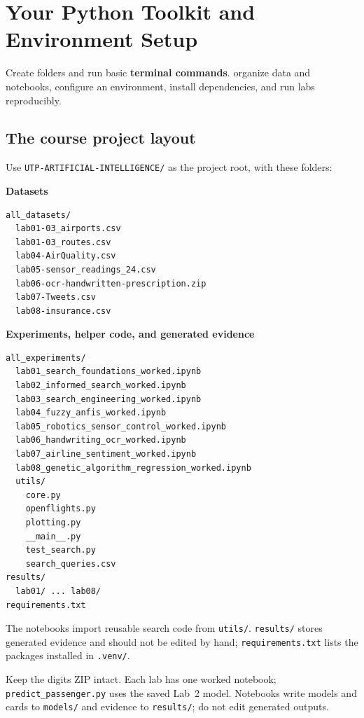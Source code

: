 \chapter{Your Python Toolkit and Environment Setup}
\label{ch:python}

\chapterguide%
  {Create folders and run basic \textbf{terminal commands}.}
  {organize data and notebooks, configure an environment, install dependencies, and run labs reproducibly.}

\section{The course project layout}

Use \texttt{UTP-ARTIFICIAL-INTELLIGENCE/} as the project root, with these folders:

\noindent\textbf{Datasets}
\begin{lstlisting}[style=mlterminal]
all_datasets/
  lab01-03_airports.csv
  lab01-03_routes.csv
  lab04-AirQuality.csv
  lab05-sensor_readings_24.csv
  lab06-ocr-handwritten-prescription.zip
  lab07-Tweets.csv
  lab08-insurance.csv
\end{lstlisting}

\noindent\textbf{Experiments, helper code, and generated evidence}
\begin{lstlisting}[style=mlterminal]
all_experiments/
  lab01_search_foundations_worked.ipynb
  lab02_informed_search_worked.ipynb
  lab03_search_engineering_worked.ipynb
  lab04_fuzzy_anfis_worked.ipynb
  lab05_robotics_sensor_control_worked.ipynb
  lab06_handwriting_ocr_worked.ipynb
  lab07_airline_sentiment_worked.ipynb
  lab08_genetic_algorithm_regression_worked.ipynb
  utils/
    core.py
    openflights.py
    plotting.py
    __main__.py
    test_search.py
    search_queries.csv
results/
  lab01/ ... lab08/
requirements.txt
\end{lstlisting}

\begin{keyidea}
The notebooks import reusable search code from \texttt{utils/}.
\texttt{results/} stores generated evidence and should not be edited by hand;
\texttt{requirements.txt} lists the packages installed in \texttt{.venv/}.
\end{keyidea}

{\footnotesize Keep the digits ZIP intact. Each lab has one worked notebook; \texttt{predict\_passenger.py} uses the saved Lab~2 model. Notebooks write models and cards to \texttt{models/} and evidence to \texttt{results/}; do not edit generated outputs.\par}

